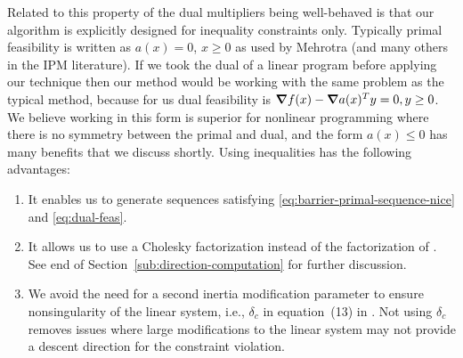 \documentclass{article}
\begin{document}
Related to this property of the dual multipliers being well-behaved is that our algorithm is explicitly designed for inequality constraints only. Typically primal feasibility is written as $a(x)=0$, $x \ge 0$ as used by Mehrotra (and many others in the IPM literature). If we took the dual of a linear program before applying our technique then our method would be working with the same problem as the typical method, because for us dual feasibility is $\grad f(x) - \grad a(x)^T y = 0, y \ge 0$. We believe working in this form is superior for nonlinear programming where there is no symmetry between the primal and dual, and the form $a(x) \le 0$ has many benefits that we discuss shortly. Using inequalities has the following advantages:
\begin{enumerate}
\item It enables us to generate sequences satisfying \eqref{eq:barrier-primal-sequence-nice} and \eqref{eq:dual-feas}.
\item It allows us to use a Cholesky factorization instead of the  \LBL{} factorization of \citet*{bunch1971direct}. See end of Section~\ref{sub:direction-computation} for further discussion.
\item We avoid the need for a second inertia modification parameter to ensure nonsingularity of the linear system, i.e., $\delta_{c}$ in equation~(13) in \cite{wachter2006implementation}.  Not using $\delta_{c}$ removes issues where large modifications to the linear system may not provide a descent direction for the constraint violation.
\end{enumerate}





\end{document}
